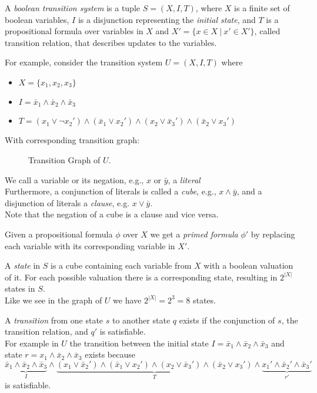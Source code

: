 \documentclass[11pt, a4paper, BCOR=10mm, ngerman]{scrbook}
\begin{document}
A \textsl{boolean transition system} is a tuple $S = (X, I, T)$, where $X$ is a finite set of boolean variables, $I$ is a disjunction representing the \textsl{initial state}, and $T$ is a propositional formula over variables in $X$ and $X' = \{x \in X \ | \ x' \in X'\}$, called transition relation, that describes updates to the variables.
\par
For example, consider the transition system $U = (X, I, T)$ where
\begin{itemize}
	\item $ X= \{x_1, x_2, x_3\}$
	\item $I = \bar x_1 \land \bar x_2 \land \bar x_3$
	\item $T = (x_1 \lor \neg x_2' ) \land ( \bar x_1 \lor x_2') \land (x_2 \lor \bar x_3') \land ( \bar x_2 \lor x_3')$
\end{itemize}
\pagebreak
With corresponding transition graph:

\begin{figure}[H]
	\centering
	
	\caption{Transition Graph of $U$.}
	\label{ex1}
\end{figure}

We call a variable or its negation, e.g., $x \text{ or } \bar y$, a \textsl{literal} \\
Furthermore, a conjunction of literals is called a \textsl{cube}, e.g.,  $x \land \bar y$, and a disjunction of literals a \textsl{clause}, e.g. $x \lor \bar y$. \\
Note that the negation of a cube is a clause and vice versa. \par

Given a propositional formula $\phi$ over $X$ we get a \textsl{primed formula} $\phi'$ by replacing each variable with its corresponding variable in $X'$. \par

A \textsl{state} in $S$ is a cube containing each variable from $X$ with a boolean valuation of it. For each possible valuation there is a corresponding state, resulting in $2^{|X|}$ states in $S$. \\
Like we see in the graph of $U$ we have $2^{|X|} = 2^3 = 8$ states.

A \textsl{transition} from one state $s$ to another state $q$ exists if the conjunction of $s$, the transition relation, and $q'$ is satisfiable.\\ For example in $U$ the transition between the initial state $I = \bar x_1 \land \bar x_2 \land \bar x_3$ and state $r = x_1 \land \bar x_2 \land \bar x_3$ exists because
\begin{equation*}
\underbrace{\bar x_1 \land \bar x_2 \land \bar x_3}_{I} \land \underbrace{(x_1 \lor \bar x_2' ) \land ( \bar x_1 \lor x_2') \land (x_2 \lor \bar x_3') \land ( \bar x_2 \lor x_3')}_T \land \underbrace{x_1' \land \bar x_2' \land \bar x_3'}_{r'}
\end{equation*}
is satisfiable.\par
\end{document}
